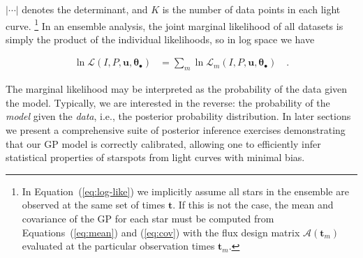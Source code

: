 \documentclass[modern,linenumbers]{aastex62}
\begin{document}
%
$| \cdots |$ denotes the determinant, and $K$ is the number of data points in
each light curve.%
\footnote{
    In Equation~(\ref{eq:log-like}) we implicitly assume all stars in the
    ensemble are observed at the same set of times $\mathbf{t}$.
    If this is not the case, the mean and covariance of the GP for each
    star must be computed from Equations~(\ref{eq:mean}) and (\ref{eq:cov})
    with the flux design matrix $\pmb{\mathcal{A}}(\mathbf{t}_m)$ evaluated
    at the particular observation times $\mathbf{t}_m$.
}
In an ensemble analysis, the joint marginal likelihood of all datasets is
simply the product of the individual likelihoods, so in log space we have
%
\begin{linenomath}\begin{align}
        \ln \mathcal{L}\left(I, P, \mathbf{u}, \pmb{\theta}_\bullet\right)
         & =
        \sum_{m} \ln \mathcal{L}_m\left(I, P, \mathbf{u}, \pmb{\theta}_\bullet\right)
        \quad.
    \end{align}\end{linenomath}
%
The marginal likelihood may be interpreted as the probability of the data
given the model. Typically, we are interested in the reverse: the probability
of the \emph{model} given the \emph{data}, i.e., the posterior probability
distribution. In later sections we present a comprehensive suite of
posterior inference exercises demonstrating that our GP model is correctly
calibrated, allowing one to efficiently infer statistical properties of starspots
from light curves with minimal bias.
\end{document}
